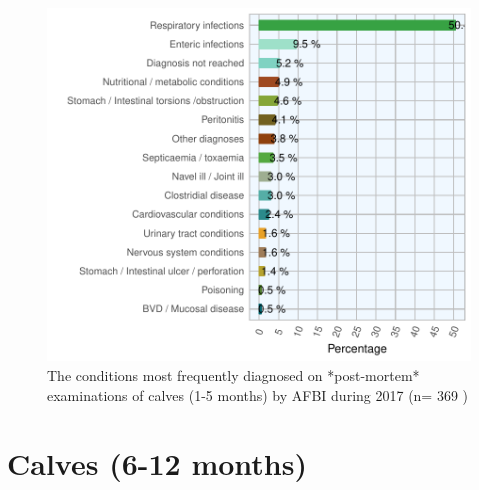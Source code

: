 \documentclass[]{book}
\begin{document}
\begin{figure}

{\centering \includegraphics{AFBI_files/figure-latex/unnamed-chunk-11-1} 

}

\caption{The conditions most frequently diagnosed on *post-mortem* examinations of calves (1-5 months) by AFBI during 2017 (n= 369 )}\label{fig:unnamed-chunk-11}
\end{figure}

\section{Calves (6-12 months)}\label{calves-6-12-months}
\end{document}
